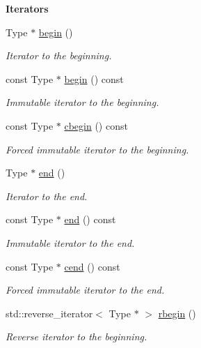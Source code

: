\begin{Indent}{\bf Iterators}\par
\begin{DoxyCompactItemize}
\item 
Type $\ast$ \hyperlink{classmagrathea_1_1AbstractNArray_a79a29a8ec98fb3098df9ca2c4a3de915}{begin} ()
\begin{DoxyCompactList}\small\item\em Iterator to the beginning. \end{DoxyCompactList}\item 
const Type $\ast$ \hyperlink{classmagrathea_1_1AbstractNArray_a0f3f46ef1edf2f14a7b6cca3643e3cf6}{begin} () const 
\begin{DoxyCompactList}\small\item\em Immutable iterator to the beginning. \end{DoxyCompactList}\item 
const Type $\ast$ \hyperlink{classmagrathea_1_1AbstractNArray_a367265e9855bcf8cb848667060320c8b}{cbegin} () const 
\begin{DoxyCompactList}\small\item\em Forced immutable iterator to the beginning. \end{DoxyCompactList}\item 
Type $\ast$ \hyperlink{classmagrathea_1_1AbstractNArray_a5c8e36c3d2ef738b4630bf67556d5ff3}{end} ()
\begin{DoxyCompactList}\small\item\em Iterator to the end. \end{DoxyCompactList}\item 
const Type $\ast$ \hyperlink{classmagrathea_1_1AbstractNArray_a78dd98d89e3c5df6e0db4c4795da346f}{end} () const 
\begin{DoxyCompactList}\small\item\em Immutable iterator to the end. \end{DoxyCompactList}\item 
const Type $\ast$ \hyperlink{classmagrathea_1_1AbstractNArray_adbb87d74b1ae848c6a577195a7a33bfc}{cend} () const 
\begin{DoxyCompactList}\small\item\em Forced immutable iterator to the end. \end{DoxyCompactList}\item 
std\-::reverse\-\_\-iterator$<$ Type $\ast$ $>$ \hyperlink{classmagrathea_1_1AbstractNArray_a98292cd9ca5cc03c3a65f5314603c7fb}{rbegin} ()
\begin{DoxyCompactList}\small\item\em Reverse iterator to the beginning. \end{DoxyCompactList}\item 

\end{DoxyCompactItemize}
\end{Indent}
